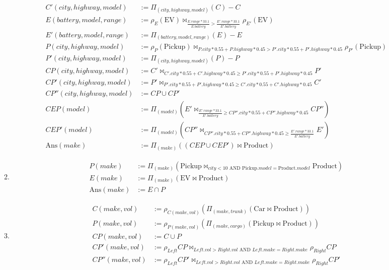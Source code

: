 \documentclass[12pt,letterpaper]{article}
\newcommand{\parens}[1]{\left(#1\right)}
\newcommand{\Ans}[0]{\text{Ans}}
\newcommand{\Car}[0]{\text{Car}}
\newcommand{\EV}[0]{\text{EV}}
\newcommand{\Pickup}[0]{\text{Pickup}}
\newcommand{\Product}[0]{\text{Product}}
\newcommand{\AND}[0]{\text{ AND }}
\begin{document}
\begin{enumerate}
\begin{enumerate}
\begin{align*}
            C'(city, highway, model) &:= \Pi_{\parens{city, highway, model}}\parens{C} - C \\
            E(battery, model, range) &:= \rho_E\parens{\EV} \bowtie_{\frac{E.range * 33.1}{E.battery} > \frac{E'.range * 33.1}{E'.battery}} \rho_{E'}\parens{\EV} \\
            E'(battery, model, range) &:= \Pi_{\parens{battery, model, range}}\parens{E} - E \\
            P(city, highway, model) &:= \rho_P\parens{\Pickup} \bowtie_{P.city * 0.55 + P.highway * 0.45 > P'.city * 0.55 + P'.highway * 0.45} \rho_{P'}\parens{\Pickup} \\
            P'(city, highway, model) &:= \Pi_{\parens{city, highway, model}}\parens{P} - P \\
            CP(city, highway, model) &:= C' \bowtie_{C'.city * 0.55 + C'.highway * 0.45 \ge P'.city * 0.55 + P'.highway * 0.45} P' \\
            CP'(city, highway, model) &:= P' \bowtie_{P'.city * 0.55 + P'.highway * 0.45 \ge C'.city * 0.55 + C'.highway * 0.45} C' \\
            CP''(city, highway, model) &:= CP \cup CP' \\
            CEP(model) &:= \Pi_{\parens{model}}\parens{E' \bowtie_{\frac{E'.range * 33.1}{E'.battery} \ge CP''.city * 0.55 + CP''.highway * 0.45} CP''} \\
            CEP'(model) &:= \Pi_{\parens{model}}\parens{CP'' \bowtie_{CP''.city * 0.55 + CP''.highway * 0.45 \ge \frac{E'.range * 33.1}{E'.battery}} E'} \\
            \Ans(make) &:= \Pi_{\parens{make}}\parens{\parens{CEP \cup CEP'} \bowtie \Product}
          \end{align*}
        \item
          \begin{align*}
            P(make) &:= \Pi_{\parens{make}}\parens{\Pickup \bowtie_{city < 10 \AND \Pickup.model = \Product.model} \Product} \\
            E(make) &:= \Pi_{\parens{make}}\parens{\EV \bowtie \Product} \\
            \Ans(make) &:= E \cap P
          \end{align*}
        \item
          \begin{align*}
            C(make, vol) &:= \rho_{C(make, vol)}\parens{\Pi_{\parens{make, trunk}}\parens{\Car \bowtie \Product}} \\
            P(make, vol) &:= \rho_{P(make, vol)}\parens{\Pi_{\parens{make, cargo}}\parens{\Pickup \bowtie \Product}} \\
            CP(make, vol) &:= C \cup P \\
            CP'(make, vol) &:= \rho_{Left}CP \bowtie_{Left.vol > Right.vol \AND Left.make = Right.make} \rho_{Right}CP \\
            CP''(make, vol) &:= \rho_{Left}CP' \bowtie_{Left.vol > Right.vol \AND Left.make = Right.make} \rho_{Right}CP' \\
          \end{align*}
      \end{enumerate}


\end{enumerate}
\end{document}
